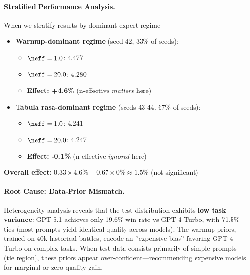 \paragraph{Stratified Performance Analysis.}
When we stratify results by dominant expert regime:

\begin{itemize}[leftmargin=*, itemsep=2pt]
    \item \textbf{Warmup-dominant regime} (seed 42, 33\% of seeds):
    \begin{itemize}
        \item $\neff=1.0$: 4.477
        \item $\neff=20.0$: 4.280
        \item \textbf{Effect: +4.6\%} (n-effective \textit{matters} here)
    \end{itemize}
    
    \item \textbf{Tabula rasa-dominant regime} (seeds 43-44, 67\% of seeds):
    \begin{itemize}
        \item $\neff=1.0$: 4.241
        \item $\neff=20.0$: 4.247
        \item \textbf{Effect: -0.1\%} (n-effective \textit{ignored} here)
    \end{itemize}
\end{itemize}

\textbf{Overall effect:} $0.33 \times 4.6\% + 0.67 \times 0\% \approx 1.5\%$ (not significant)


\paragraph{Root Cause: Data-Prior Mismatch.}
Heterogeneity analysis reveals that the test distribution exhibits \textbf{low task variance}: GPT-5.1 achieves only 19.6\% win rate vs GPT-4-Turbo, with 71.5\% ties (most prompts yield identical quality across models). The warmup priors, trained on 40k historical battles, encode an ``expensive-bias'' favoring GPT-4-Turbo on complex tasks. When test data consists primarily of simple prompts (tie region), these priors appear over-confident---recommending expensive models for marginal or zero quality gain.

